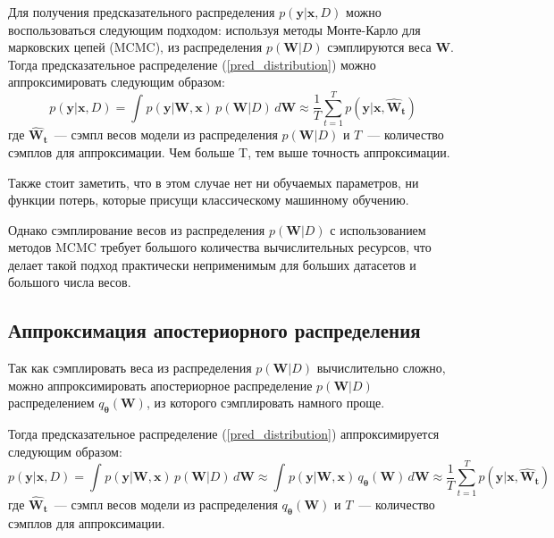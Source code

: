 \documentclass{article}
\numberwithin{equation}{section}
\begin{document}
    Для получения предсказательного распределения $p(\pmb{y} | \pmb{x}, D)$
    можно воспользоваться следующим подходом:
    используя методы Монте-Карло для марковских цепей (MCMC),
    из распределения $p(\pmb{W}| D)$ сэмплируются веса $\pmb{W}$.
    Тогда предсказательное распределение (\ref{pred_distribution})
    можно аппроксимировать следующим образом:
    \begin{equation}
        p(\pmb{y} | \pmb{x}, D)
        =
        \int_{}{
            p(\pmb{y} | \pmb{W}, \pmb{x})
            \,
            p(\pmb{W} | D)
            \,
            d\pmb{W}
        }
        \approx
            \frac{1}{T}
            \sum_{t=1}^{T}{
                p (
                    \pmb{y} | \pmb{x},
                    \pmb{\hat{W}_{t}}
                )
            }
    \end{equation}
    где $\pmb{\hat{W}_{t}}$~--- сэмпл весов модели из распределения $p(\pmb{W}| D)$
    и $T$~--- количество сэмплов для аппроксимации.
    Чем больше T, тем выше точность аппроксимации.

    Также стоит заметить, что в этом случае нет ни обучаемых параметров, ни функции потерь,
    которые присущи классическому машинному обучению.

    Однако сэмплирование весов из распределения $p(\pmb{W}| D)$ с использованием методов MCMC
    требует большого количества вычислительных ресурсов,
    что делает такой подход практически неприменимым для больших датасетов и большого числа весов.

    \subsection{Аппроксимация апостериорного распределения}

    Так как сэмплировать веса из распределения $p(\pmb{W}| D)$ вычислительно сложно,
    можно аппроксимировать апостериорное распределение $p(\pmb{W}| D)$
    распределением $q_{\pmb{\theta}}(\pmb{W})$, из которого сэмплировать намного проще.

    Тогда предсказательное распределение (\ref{pred_distribution})
    аппроксимируется следующим образом:
    \begin{equation}
        p(\pmb{y} | \pmb{x}, D)
        =
        \int_{}{
            p(\pmb{y} | \pmb{W}, \pmb{x})
            \,
            p(\pmb{W} | D)
            \,
            d\pmb{W}
        }
        \approx
        \int_{}{
            p(\pmb{y} | \pmb{W}, \pmb{x})
            \,
            q_{\pmb{\theta}}(\pmb{W})
            \,
            d\pmb{W}
        }
        \approx
            \frac{1}{T}
            \sum_{t=1}^{T}{
                p (
                    \pmb{y} | \pmb{x},
                    \pmb{\hat{W}_{t}}
                )
            }
    \end{equation}
    где $\pmb{\hat{W}_{t}}$~--- сэмпл весов модели из распределения $q_{\pmb{\theta}}(\pmb{W})$
    и $T$~--- количество сэмплов для аппроксимации.
\end{document}
